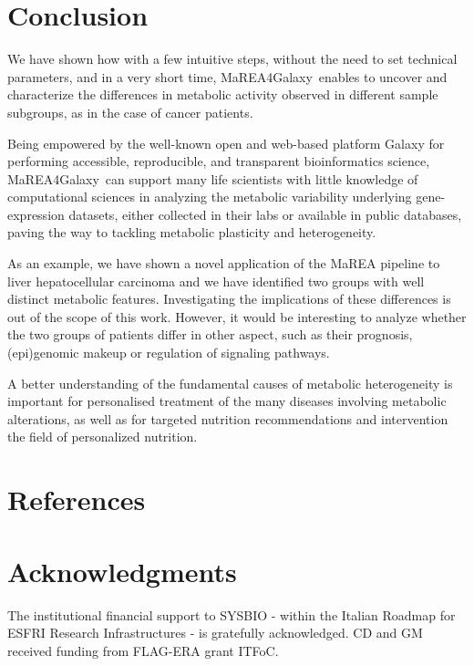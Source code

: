 \documentclass[preprint,12pt,authoryear]{elsarticle}
\newcommand{\mareagalaxy}{\textsf{MaREA4Galaxy}}
\begin{document}
\section{Conclusion}
We have shown how with a few intuitive steps, without the need to set technical parameters, and in a very short time, \mareagalaxy\ enables to uncover and characterize the differences in metabolic activity observed in different sample subgroups, as in the case of cancer patients. 

Being empowered by the well-known open and web-based platform Galaxy for performing accessible, reproducible, and transparent bioinformatics science,
\mareagalaxy\ can support many life scientists with little knowledge of computational sciences in analyzing the metabolic variability underlying gene-expression datasets, either collected in their labs or available in public databases, paving the way to tackling metabolic plasticity and heterogeneity. 

As an example, we have shown a novel application of the \textsf{MaREA} pipeline to liver hepatocellular carcinoma and we have identified two groups with well distinct metabolic features. Investigating the implications of these differences is out of the scope of this work. However, it would be interesting to analyze whether the two groups of patients differ in other aspect, such as their prognosis, (epi)genomic makeup or regulation of signaling pathways.  

A better understanding of the fundamental causes of metabolic heterogeneity is important for personalised treatment of the many diseases involving metabolic alterations, as well as for targeted nutrition recommendations and intervention the field of personalized nutrition.




\clearpage
\section*{References}

  
 
 
\section*{Acknowledgments}
The institutional financial support to SYSBIO - within the Italian Roadmap for ESFRI Research Infrastructures - is gratefully acknowledged. CD and GM received funding from FLAG-ERA grant ITFoC.





\end{document}

